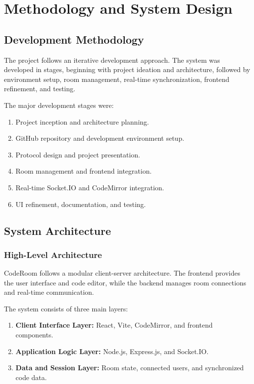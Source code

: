 \documentclass[12pt,a4paper,oneside]{report}
\begin{document}
\chapter{Methodology and System Design}

\section{Development Methodology}

The project follows an iterative development approach. The system was developed in stages, beginning with project ideation and architecture, followed by environment setup, room management, real-time synchronization, frontend refinement, and testing.

The major development stages were:

\begin{enumerate}
    \item Project inception and architecture planning.
    \item GitHub repository and development environment setup.
    \item Protocol design and project presentation.
    \item Room management and frontend integration.
    \item Real-time Socket.IO and CodeMirror integration.
    \item UI refinement, documentation, and testing.
\end{enumerate}

\section{System Architecture}

\subsection{High-Level Architecture}

CodeRoom follows a modular client-server architecture. The frontend provides the user interface and code editor, while the backend manages room connections and real-time communication.

The system consists of three main layers:

\begin{enumerate}
    \item \textbf{Client Interface Layer:} React, Vite, CodeMirror, and frontend components.
    \item \textbf{Application Logic Layer:} Node.js, Express.js, and Socket.IO.
    \item \textbf{Data and Session Layer:} Room state, connected users, and synchronized code data.
\end{enumerate}
\end{document}
